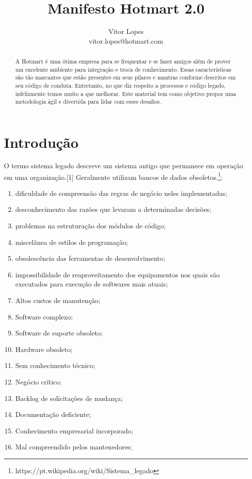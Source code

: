\documentclass[a4paper]{article}
\title{\textbf{Manifesto Hotmart 2.0}}
\author{Vitor Lopes \\ vitor.lopes@hotmart.com}
\begin{document}
\maketitle
\begin{abstract}
    A Hotmart é uma ótima empresa para se frequentar e se fazer amigos além de prover um excelente ambiente para integração e troca de conhecimento. Essas características são tão marcantes que estão presentes em seus pilares e mantras conforme descritos em seu código de conduta. Entretanto, no que diz respeito a processos e código legado, infelizmente temos muito a que melhorar.
    Este material tem como objetivo propor uma metodologia ágil e divertida para lidar com esses desafios.
\end{abstract}
\section{Introdução}
O termo sistema legado descreve um sistema antigo que permanece em operação em uma organização.[1] Geralmente utilizam bancos de dados obsoletos.\footnote{https://pt.wikipedia.org/wiki/Sistema\_legado}:
\begin{enumerate}
    \item dificuldade de compreensão das regras de negócio neles implementadas;
    \item desconhecimento das razões que levaram a determinadas decisões;
    \item problemas na estruturação dos módulos de código;
    \item miscelânea de estilos de programação;
    \item obsolescência das ferramentas de desenvolvimento;
    \item impossibilidade de reaproveitamento dos equipamentos nos quais são executados para execução de softwares mais atuais;
    \item Altos custos de manutenção;
    \item Software complexo;
    \item Software de suporte obsoleto;
    \item Hardware obsoleto;
    \item Sem conhecimento técnico;
    \item Negócio crítico;
    \item Backlog de solicitações de mudança;
    \item Documentação deficiente;
    \item Conhecimento empresarial incorporado;
    \item Mal compreendido pelos mantenedores;
\end{enumerate}
\end{document}
